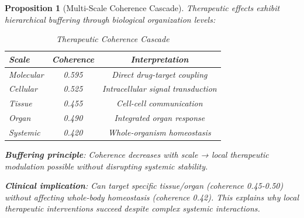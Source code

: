 \documentclass[11pt,a4paper]{article}
\newtheorem{proposition}[theorem]{Proposition}
\theoremstyle{definition}
\theoremstyle{remark}
\begin{document}
\begin{proposition}[Multi-Scale Coherence Cascade]
Therapeutic effects exhibit hierarchical buffering through biological organization levels:

\begin{table}[H]
\centering
\caption{Therapeutic Coherence Cascade}
\begin{tabular}{lcc}
\toprule
\textbf{Scale} & \textbf{Coherence} & \textbf{Interpretation} \\
\midrule
Molecular & 0.595 & Direct drug-target coupling \\
Cellular & 0.525 & Intracellular signal transduction \\
Tissue & 0.455 & Cell-cell communication \\
Organ & 0.490 & Integrated organ response \\
Systemic & 0.420 & Whole-organism homeostasis \\
\bottomrule
\end{tabular}
\end{table}

\textbf{Buffering principle}: Coherence decreases with scale → local therapeutic modulation possible without disrupting systemic stability.

\textbf{Clinical implication}: Can target specific tissue/organ (coherence 0.45-0.50) without affecting whole-body homeostasis (coherence 0.42). This explains why local therapeutic interventions succeed despite complex systemic interactions.
\end{proposition}
\end{document}
